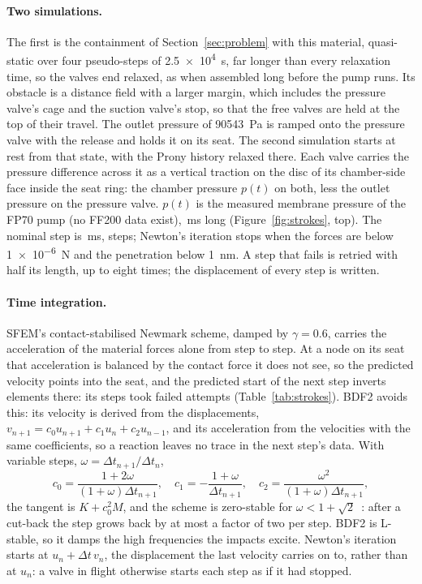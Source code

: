 \documentclass[sigconf,nonacm]{acmart}
\begin{document}
\paragraph{Two simulations.} The first is the containment of Section~\ref{sec:problem}
with this material, quasi-static over four pseudo-steps of \SI{2.5e4}{\second}, far longer than
every relaxation time, so the valves end relaxed, as when assembled long before the pump runs.
Its obstacle is a distance field with a larger margin, which includes the pressure valve's cage
and the suction valve's stop, so that the free valves are held at the top of their travel. The
outlet pressure of \SI{90543}{\pascal} is ramped onto the pressure valve with the release and
holds it on its seat. The second simulation starts at rest from that state, with the Prony
history relaxed there. Each valve carries the pressure difference across it as a vertical
traction on the disc of its chamber-side face inside the seat ring: the chamber pressure $p(t)$
on both, less the outlet pressure on the pressure valve. $p(t)$ is the measured membrane pressure
of the FP70 pump (no FF200 data exist), \trEnd\,\si{\milli\second} long
(Figure~\ref{fig:strokes}, top). The nominal step is \trDtMs\,\si{\milli\second},
\trStepsNominal{} steps; Newton's iteration stops when the forces are below \SI{1e-6}{\newton}
and the penetration below \SI{1}{\nano\metre}. A step that fails is retried with half its length,
up to eight times; the displacement of every step is written.

\paragraph{Time integration.} SFEM's contact-stabilised Newmark scheme,
damped by $\gamma=0.6$, carries the acceleration of the material forces alone from step to step.
At a node on its seat that acceleration is balanced by the contact force it does not see, so the
predicted velocity points into the seat, and the predicted start of the next step inverts elements
there: its \trStepsNewmark{} steps took \trFailedNewmark{} failed attempts
(Table~\ref{tab:strokes}). BDF2 avoids this: its velocity is derived from the displacements,
$v_{n+1} = c_0u_{n+1} + c_1u_n + c_2u_{n-1}$, and its acceleration from the velocities with the
same coefficients, so a reaction leaves no trace in the next step's data. With variable steps,
$\omega = \Delta t_{n+1}/\Delta t_n$,
\begin{equation}
  c_0 = \frac{1+2\omega}{(1+\omega)\Delta t_{n+1}},\quad
  c_1 = -\frac{1+\omega}{\Delta t_{n+1}},\quad
  c_2 = \frac{\omega^2}{(1+\omega)\Delta t_{n+1}},
\end{equation}
the tangent is $K + c_0^2M$, and the scheme is zero-stable for $\omega < 1+\sqrt2$~\cite{grigorieff1983}:
after a cut-back the step grows back by at most a factor of two per step. BDF2 is L-stable, so it damps
the high frequencies the impacts excite. Newton's iteration starts at $u_n + \Delta t\,v_n$,
the displacement the last velocity carries on to, rather than at $u_n$: a valve in flight
otherwise starts each step as if it had stopped.
\end{document}
